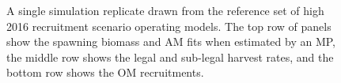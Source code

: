 \documentclass[11pt]{book}
\begin{document}
\begin{landscape}
\begin{figure}[htb]

{\centering {} 

}

\caption{A single simulation replicate drawn from the reference set of high 2016 recruitment scenario operating models. The top row of panels show the spawning biomass and AM fits when estimated by an MP, the middle row shows the legal and sub-legal harvest rates, and the bottom row shows the OM recruitments.}\label{fig:unnamed-chunk-17}
\end{figure}
\newpage
\begin{figure}[htb]

{\centering {} 

}
\end{figure}
\end{landscape}
\end{document}
